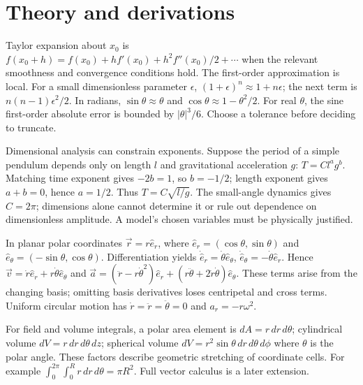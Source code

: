 \documentclass[11pt,a4paper,openany]{book}
\begin{document}
\section{Theory and derivations}
Taylor expansion about $x_0$ is $f(x_0+h)=f(x_0)+hf'(x_0)+h^2f''(x_0)/2+\cdots$ when the relevant smoothness and convergence conditions hold. The first-order approximation is local. For a small dimensionless parameter $\epsilon$, $(1+\epsilon)^n\approx1+n\epsilon$; the next term is $n(n-1)\epsilon^2/2$. In radians, $\sin\theta\approx\theta$ and $\cos\theta\approx1-\theta^2/2$. For real $\theta$, the sine first-order absolute error is bounded by $|\theta|^3/6$. Choose a tolerance before deciding to truncate.

Dimensional analysis can constrain exponents. Suppose the period of a simple pendulum depends only on length $l$ and gravitational acceleration $g$: $T=C l^a g^b$. Matching time exponent gives $-2b=1$, so $b=-1/2$; length exponent gives $a+b=0$, hence $a=1/2$. Thus $T=C\sqrt{l/g}$. The small-angle dynamics gives $C=2\pi$; dimensions alone cannot determine it or rule out dependence on dimensionless amplitude. A model's chosen variables must be physically justified.

In planar polar coordinates $\vec r=r\hat e_r$, where $\hat e_r=(\cos\theta,\sin\theta)$ and $\hat e_\theta=(-\sin\theta,\cos\theta)$. Differentiation yields $\dot{\hat e}_r=\dot\theta\hat e_\theta$, $\dot{\hat e}_\theta=-\dot\theta\hat e_r$. Hence $\vec v=\dot r\hat e_r+r\dot\theta\hat e_\theta$ and $\vec a=(\ddot r-r\dot\theta^2)\hat e_r+(r\ddot\theta+2\dot r\dot\theta)\hat e_\theta$. These terms arise from the changing basis; omitting basis derivatives loses centripetal and cross terms. Uniform circular motion has $\dot r=\ddot r=\ddot\theta=0$ and $a_r=-r\omega^2$.

For field and volume integrals, a polar area element is $dA=r\,dr\,d\theta$; cylindrical volume $dV=r\,dr\,d\theta\,dz$; spherical volume $dV=r^2\sin\theta\,dr\,d\theta\,d\phi$ where $\theta$ is the polar angle. These factors describe geometric stretching of coordinate cells. For example $\int_0^{2\pi}\int_0^R r\,dr\,d\theta=\pi R^2$. Full vector calculus is a later extension.
\begin{center}
\end{center}
\end{document}

